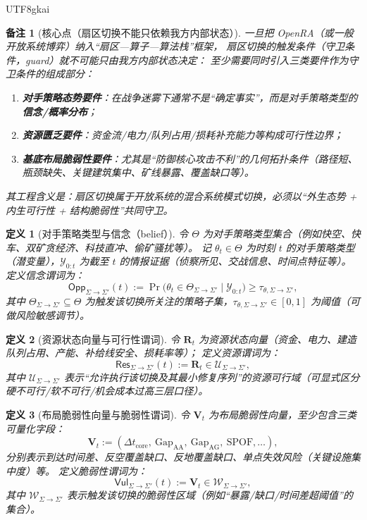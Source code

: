 \documentclass[12pt]{article}
\newtheorem{definition}{定义}[section]
\newtheorem{remark}{备注}[section]
\begin{document}
\begin{CJK*}{UTF8}{gkai}
\begin{remark}[核心点（扇区切换不能只依赖我方内部状态）]
一旦把 \textsf{OpenRA}（或一般开放系统博弈）纳入“扇区—算子—算法栈”框架，
扇区切换的触发条件（守卫条件，guard）就不可能只由我方内部状态决定：
至少需要同时引入三类要件作为守卫条件的组成部分：
\begin{enumerate}
  \item \textbf{对手策略态势要件}：在战争迷雾下通常不是“确定事实”，而是对手策略类型的\textbf{信念/概率分布}；
  \item \textbf{资源匮乏要件}：资金流/电力/队列占用/损耗补充能力等构成可行性边界；
  \item \textbf{基底布局脆弱性要件}：尤其是“防御核心攻击不利”的几何拓扑条件（路径短、瓶颈缺失、关键建筑集中、矿线暴露、覆盖缺口等）。
\end{enumerate}
其工程含义是：扇区切换属于开放系统的混合系统模式切换，必须以“外生态势 + 内生可行性 + 结构脆弱性”共同守卫。
\end{remark}

\begin{definition}[对手策略类型与信念（belief）]
令 $\Theta$ 为对手策略类型集合（例如快空、快车、双矿贪经济、科技直冲、偷矿骚扰等）。
记 $\theta_t\in\Theta$ 为时刻 $t$ 的对手策略类型（潜变量），$\mathcal{Y}_{0:t}$ 为截至 $t$ 的情报证据（侦察所见、交战信息、时间点特征等）。
定义信念谓词为：
\[
  \mathsf{Opp}_{\Sigma\to\Sigma'}(t)
  :=
  \Pr\bigl(\theta_t\in\Theta_{\Sigma\to\Sigma'}\mid \mathcal{Y}_{0:t}\bigr)\ge \tau_{\theta,\Sigma\to\Sigma'},
\]
其中 $\Theta_{\Sigma\to\Sigma'}\subseteq\Theta$ 为触发该切换所关注的策略子集，$\tau_{\theta,\Sigma\to\Sigma'}\in[0,1]$ 为阈值（可做风险敏感调节）。
\end{definition}

\begin{definition}[资源状态向量与可行性谓词]
令 $\mathbf{R}_t$ 为资源状态向量（资金、电力、建造队列占用、产能、补给线安全、损耗率等）；
定义资源谓词为：
\[
  \mathsf{Res}_{\Sigma\to\Sigma'}(t) := \mathbf{R}_t\in\mathcal{U}_{\Sigma\to\Sigma'},
\]
其中 $\mathcal{U}_{\Sigma\to\Sigma'}$ 表示“允许执行该切换及其最小修复序列”的资源可行域（可显式区分硬不可行/软不可行/机会成本过高三层口径）。
\end{definition}

\begin{definition}[布局脆弱性向量与脆弱性谓词]
令 $\mathbf{V}_t$ 为布局脆弱性向量，至少包含三类可量化字段：
\[
  \mathbf{V}_t := (\Delta t_{\mathrm{core}},\ \mathrm{Gap}_{\mathrm{AA}},\ \mathrm{Gap}_{\mathrm{AG}},\ \mathrm{SPOF},
    \ldots),
\]
分别表示到达时间差、反空覆盖缺口、反地覆盖缺口、单点失效风险（关键设施集中度）等。
定义脆弱性谓词为：
\[
  \mathsf{Vul}_{\Sigma\to\Sigma'}(t) := \mathbf{V}_t\in\mathcal{W}_{\Sigma\to\Sigma'},
\]
其中 $\mathcal{W}_{\Sigma\to\Sigma'}$ 表示触发该切换的脆弱性区域（例如“暴露/缺口/时间差超阈值”的集合）。
\end{definition}


\end{CJK*}
\end{document}
